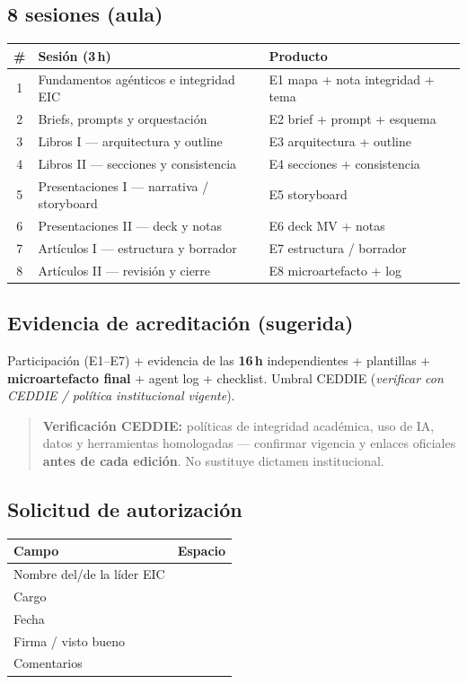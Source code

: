 \documentclass[10pt,a4paper]{article}
\newcommand{\ceddie}{\emph{verificar con CEDDIE / política institucional vigente}}
\begin{document}
\subsection*{8 sesiones (aula)}
\begin{tabularx}{\textwidth}{@{}cXl@{}}
\toprule
\# & Sesión (3\,h) & Producto \\
\midrule
1 & Fundamentos agénticos e integridad EIC & E1 mapa + nota integridad + tema \\
2 & Briefs, prompts y orquestación & E2 brief + prompt + esquema \\
3 & Libros I --- arquitectura y outline & E3 arquitectura + outline \\
4 & Libros II --- secciones y consistencia & E4 secciones + consistencia \\
5 & Presentaciones I --- narrativa / storyboard & E5 storyboard \\
6 & Presentaciones II --- deck y notas & E6 deck MV + notas \\
7 & Artículos I --- estructura y borrador & E7 estructura / borrador \\
8 & Artículos II --- revisión y cierre & E8 microartefacto + log \\
\bottomrule
\end{tabularx}

\subsection*{Evidencia de acreditación (sugerida)}
Participación (E1--E7) + evidencia de las \textbf{16\,h} independientes + plantillas + \textbf{microartefacto final} + agent log + checklist. Umbral CEDDIE (\ceddie).

\begin{quote}
\textbf{Verificación CEDDIE:} políticas de integridad académica, uso de IA, datos y herramientas homologadas --- confirmar vigencia y enlaces oficiales \textbf{antes de cada edición}. No sustituye dictamen institucional.
\end{quote}

\subsection*{Solicitud de autorización}
\begin{tabularx}{\textwidth}{@{}lX@{}}
\toprule
Campo & Espacio \\
\midrule
Nombre del/de la líder EIC & \hrulefill \\
Cargo & \hrulefill \\
Fecha & \hrulefill \\
Firma / visto bueno & \hrulefill \\
Comentarios & \hrulefill \\
\bottomrule
\end{tabularx}
\end{document}
